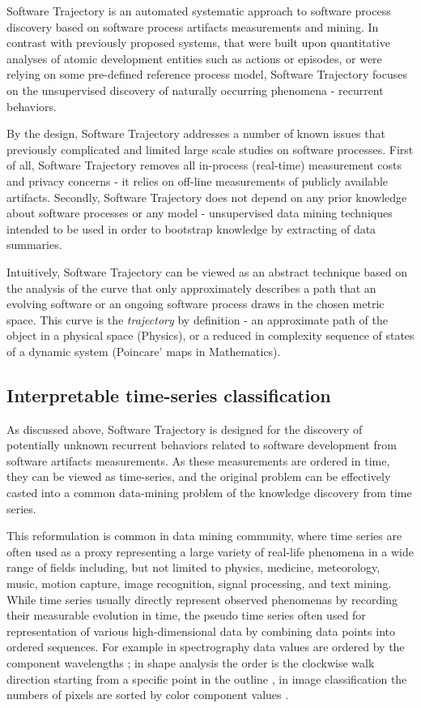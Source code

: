 Software Trajectory is an automated systematic approach to software process discovery based on software process 
artifacts measurements and mining. In contrast with previously proposed systems, that were built upon quantitative 
analyses of atomic development entities such as actions or episodes, or were relying on some pre-defined reference 
process model, Software Trajectory focuses on the unsupervised discovery of naturally occurring phenomena 
- recurrent behaviors. 

By the design, Software Trajectory addresses a number of known issues that previously complicated and limited 
large scale studies on software processes.
First of all, Software Trajectory removes all in-process (real-time) measurement costs and privacy concerns - it relies 
on off-line measurements of publicly available artifacts. 
Secondly, Software Trajectory does not depend on any prior knowledge about software processes or any model - 
unsupervised data mining techniques intended to be used in order to bootstrap knowledge by extracting of data 
summaries. 

Intuitively, Software Trajectory can be viewed as an abstract technique based on the analysis of the curve that only 
approximately describes a path that an evolving software or an ongoing software process draws in the chosen 
metric space. 
This curve is the \textit{trajectory} by definition - an approximate path of the object in a physical space (Physics), 
or a reduced in complexity sequence of states of a dynamic system (Poincare' maps in Mathematics). 

%
%
\subsection{Interpretable time-series classification}
As discussed above, Software Trajectory is designed for the discovery of potentially unknown recurrent 
behaviors related to software development from software artifacts measurements. As these measurements 
are ordered in time, they can be viewed as time-series, and the original problem can be effectively casted
into a common data-mining problem of the knowledge discovery from time series.

This reformulation is common in data mining community, where time series are often used as a proxy 
representing a large variety of real-life phenomena in a wide range of fields including, but not limited to physics, 
medicine, meteorology, music, motion capture, image recognition, signal processing, and text mining. 
While time series usually directly represent observed phenomenas by recording their measurable evolution 
in time, the pseudo time series often used for representation of various high-dimensional data 
by combining data points into ordered sequences. 
For example in spectrography data values are ordered by the component wavelengths \cite{citeulike:12550833};
in shape analysis the order is the clockwise walk direction starting from a specific point in the outline 
\cite{citeulike:12550835}, in image classification the numbers of pixels are sorted by color component 
values \cite{citeulike:2900542}.

